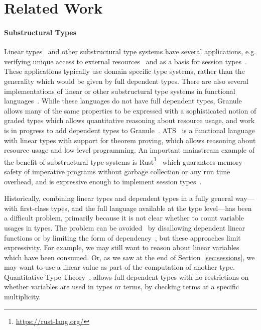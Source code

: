 \section{Related Work}

\paragraph*{Substructural Types}

Linear types~\cite{wadler-linear} and other substructural type systems have
several applications, e.g. verifying unique access to
external resources~\cite{Ennals2004} and as a basis for session
types~\cite{Honda1993}.  These applications typically use domain specific type
systems, rather than the generality which would be given by full dependent
types.  There are also several implementations of linear or other substructural
type systems in functional
languages~\cite{Tov2011a,granule,cleanuniq,Morris2016}.
While these languages do not
have full dependent types, Granule~\cite{granule} allows many of the
same properties to be expressed with a sophisticated notion of graded types
which allows quantitative reasoning about resource usage, and work is in
progress to add dependent types to Granule~\cite{granuleesop,granulepopl}. 
%
ATS~\cite{Shi2013} is a functional language with linear types with support for
theorem proving, which allows reasoning about resource usage and low level
programming. An important mainstream example of the benefit of substructural
type systems is Rust\footnote{\url{https://rust-lang.org/}}~\cite{rustbelt}
which guarantees memory safety of imperative programs without garbage
collection or any run time overhead, and is expressive enough to implement
session types~\cite{rustsession}.

Historically, combining linear types and dependent types in a fully
general way---with first-class types, and the full language available
at the type level---has been a difficult problem, primarily because it is not
clear whether to count variable usages in types. The problem can be
avoided~\cite{Krishnaswami-ldtp} by disallowing dependent linear functions or
by limiting the form of dependency~\cite{Gaboardi2013},
but these approaches limit expressivity. For
example, we may still want to reason about linear variables which have been
consumed. Or, as we saw at the end of Section~\ref{sec:sessions}, we may
want to use a linear value as part of the computation of another type.
Quantitative Type Theory~\cite{qtt,nuttin}, allows full dependent
types with no restrictions on whether variables are used in types or terms, by
checking terms at a specific multiplicity.

